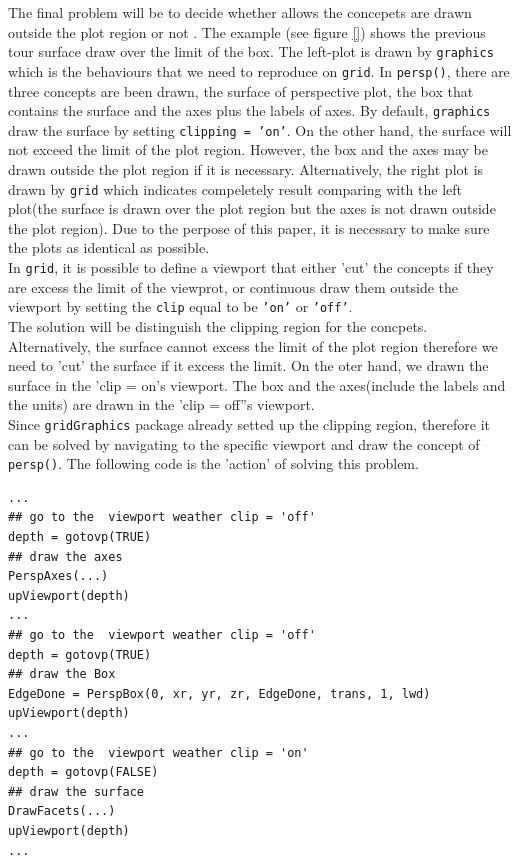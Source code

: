 \documentclass[paper=a4, fontsize=11pt]{report}
\begin{document}
The final problem will be to decide whether allows the concepets are drawn outside the plot region or not . The example (see figure \ref{}) shows the previous tour surface draw over the limit of the box. The left-plot is drawn by \texttt{graphics} which is the behaviours that we need to reproduce on \texttt{grid}. In \texttt{persp()}, there are three concepts are been drawn, the surface of perspective plot, the box that contains the surface and the axes plus the labels of axes. By default, \texttt{graphics} draw the surface by setting \texttt{clipping = 'on'}. On the other hand, the surface will not exceed the limit of the plot region. However, the box and the axes may be drawn outside the plot region if it is necessary. Alternatively, the right plot is drawn by \texttt{grid} which indicates compeletely result comparing with the left plot(the surface is drawn over the plot region but the axes is not drawn outside the plot region). Due to the perpose of this paper, it is necessary to make sure the plots as identical as possible.\\
In \texttt{grid}, it is possible to define a viewport that either 'cut' the concepts if they are excess the limit of the viewprot, or continuous draw them outside the viewport by setting the \texttt{clip} equal to be \texttt{'on'} or \texttt{'off'}.\\
The solution will be distinguish the clipping region for the concpets. Alternatively, the surface cannot excess the limit of the plot region therefore we need to 'cut' the surface if it excess the limit. On the oter hand, we drawn the surface in the 'clip = on's viewport. The box and the axes(include the labels and the units) are drawn in the 'clip = off''s viewport.\\
Since \texttt{gridGraphics} package already setted up the clipping region, therefore it can be solved by  navigating to the specific viewport and draw the concept of \texttt{persp()}. The following code is the 'action' of solving this problem.
\begin{lstlisting}
...
## go to the  viewport weather clip = 'off'
depth = gotovp(TRUE)
## draw the axes
PerspAxes(...)
upViewport(depth)
...
## go to the  viewport weather clip = 'off'
depth = gotovp(TRUE)
## draw the Box
EdgeDone = PerspBox(0, xr, yr, zr, EdgeDone, trans, 1, lwd)
upViewport(depth)
...
## go to the  viewport weather clip = 'on'
depth = gotovp(FALSE)
## draw the surface
DrawFacets(...)
upViewport(depth)
...
\end{lstlisting}\\
\end{document}
